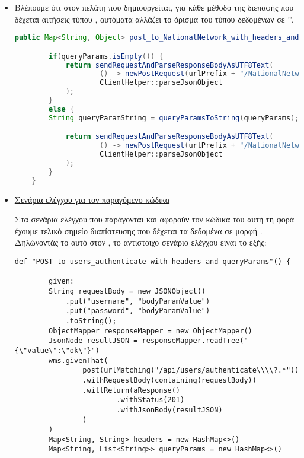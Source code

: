 \begin{itemize}
    \item \underline{}
    
    Βλέπουμε ότι στον πελάτη που δημιουργείται, 
    για κάθε μέθοδο της διεπαφής που δέχεται αιτήσεις τύπου ,
    αυτόματα αλλάζει το όρισμα του τύπου δεδομένων σε ''.    

    \begin{lstlisting}[language=java]
    public Map<String, Object> post_to_NationalNetwork_with_headers_and_queryParams(String input, Map<String, String> headers, Map<String, List<String>> queryParams) {

        if(queryParams.isEmpty()) {
            return sendRequestAndParseResponseBodyAsUTF8Text(
                    () -> newPostRequest(urlPrefix + "/NationalNetwork", "application/json", HttpRequest.BodyPublishers.ofString(input), headers),
                    ClientHelper::parseJsonObject
            );
        }
        else {
        String queryParamString = queryParamsToString(queryParams);

            return sendRequestAndParseResponseBodyAsUTF8Text(
                    () -> newPostRequest(urlPrefix + "/NationalNetwork" + queryParamString, "application/json", HttpRequest.BodyPublishers.ofString(input), headers),
                    ClientHelper::parseJsonObject
            );
        }
    }
    \end{lstlisting}

    \item \underline{Σενάρια ελέγχου για τον παραγόμενο κώδικα}

    Στα σενάρια ελέγχου που παράγονται και αφορούν τον κώδικα του 
    αυτή τη φορά έχουμε τελικό σημείο διαπίστευσης που δέχεται τα δεδομένα σε μορφή .
    Δηλώνοντάς το αυτό στον ,
    το αντίστοιχο σενάριο ελέγχου είναι το εξής:

    \begin{lstlisting}[deletekeywords={api,body}]
    def "POST to users_authenticate with headers and queryParams"() {

        given:
        String requestBody = new JSONObject()
            .put("username", "bodyParamValue")
            .put("password", "bodyParamValue")
            .toString();
        ObjectMapper responseMapper = new ObjectMapper()
        JsonNode resultJSON = responseMapper.readTree("{\"value\":\"ok\"}")
        wms.givenThat(
                post(urlMatching("/api/users/authenticate\\\\?.*"))
                .withRequestBody(containing(requestBody))
                .willReturn(aResponse()
                        .withStatus(201)
                        .withJsonBody(resultJSON)
                )
        )
        Map<String, String> headers = new HashMap<>()
        Map<String, List<String>> queryParams = new HashMap<>()
        

\end{lstlisting}
\end{itemize}
